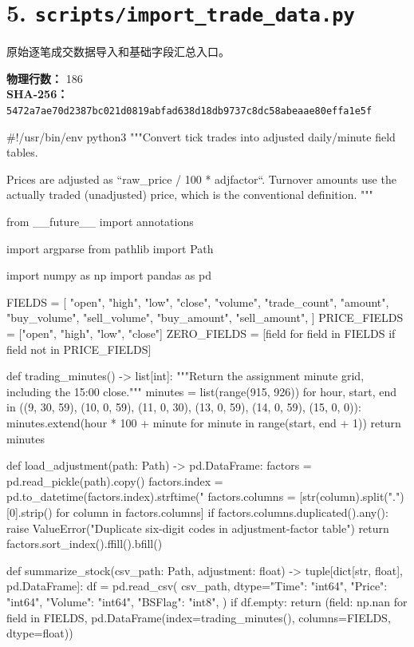 \documentclass[UTF8,a4paper,fontset=fandol]{ctexart}
\begin{document}
\section{5. \texttt{scripts/import\_trade\_data.py}}
原始逐笔成交数据导入和基础字段汇总入口。

\textbf{物理行数：} 186\\
\textbf{SHA-256：} \texttt{5472a7ae70d2387bc021d0819abfad638d18db9737c8dc58abeaae80effa1e5f}

\begin{ProjectCode}
#!/usr/bin/env python3
"""Convert tick trades into adjusted daily/minute field tables.

Prices are adjusted as ``raw_price / 100 * adjfactor``.  Turnover amounts use
the actually traded (unadjusted) price, which is the conventional definition.
"""

from __future__ import annotations

import argparse
from pathlib import Path

import numpy as np
import pandas as pd


FIELDS = [
    "open", "high", "low", "close", "volume", "trade_count", "amount",
    "buy_volume", "sell_volume", "buy_amount", "sell_amount",
]
PRICE_FIELDS = ["open", "high", "low", "close"]
ZERO_FIELDS = [field for field in FIELDS if field not in PRICE_FIELDS]


def trading_minutes() -> list[int]:
    """Return the assignment minute grid, including the 15:00 close."""
    minutes = list(range(915, 926))
    for hour, start, end in ((9, 30, 59), (10, 0, 59), (11, 0, 30),
                             (13, 0, 59), (14, 0, 59), (15, 0, 0)):
        minutes.extend(hour * 100 + minute for minute in range(start, end + 1))
    return minutes


def load_adjustment(path: Path) -> pd.DataFrame:
    factors = pd.read_pickle(path).copy()
    factors.index = pd.to_datetime(factors.index).strftime("%
    factors.columns = [str(column).split(".")[0].strip() for column in factors.columns]
    if factors.columns.duplicated().any():
        raise ValueError("Duplicate six-digit codes in adjustment-factor table")
    return factors.sort_index().ffill().bfill()


def summarize_stock(csv_path: Path, adjustment: float) -> tuple[dict[str, float], pd.DataFrame]:
    df = pd.read_csv(
        csv_path,
        dtype={"Time": "int64", "Price": "int64", "Volume": "int64", "BSFlag": "int8"},
    )
    if df.empty:
        return ({field: np.nan for field in FIELDS},
                pd.DataFrame(index=trading_minutes(), columns=FIELDS, dtype=float))


\end{ProjectCode}
\end{document}
